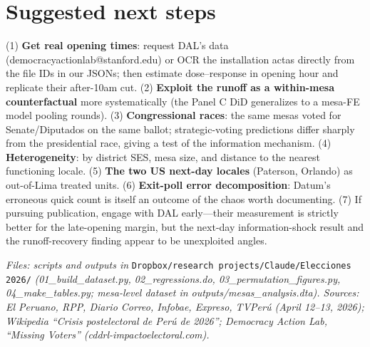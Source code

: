 \documentclass[11pt]{article}
\begin{document}
\section{Suggested next steps}

(1) \textbf{Get real opening times}: request DAL's data (democracyactionlab@stanford.edu) or OCR the installation actas directly from the file IDs in our JSONs; then estimate dose--response in opening hour and replicate their after-10am cut. (2) \textbf{Exploit the runoff as a within-mesa counterfactual} more systematically (the Panel C DiD generalizes to a mesa-FE model pooling rounds). (3) \textbf{Congressional races}: the same mesas voted for Senate/Diputados on the same ballot; strategic-voting predictions differ sharply from the presidential race, giving a test of the information mechanism. (4) \textbf{Heterogeneity}: by district SES, mesa size, and distance to the nearest functioning locale. (5) \textbf{The two US next-day locales} (Paterson, Orlando) as out-of-Lima treated units. (6) \textbf{Exit-poll error decomposition}: Datum's erroneous quick count is itself an outcome of the chaos worth documenting. (7) If pursuing publication, engage with DAL early---their measurement is strictly better for the late-opening margin, but the next-day information-shock result and the runoff-recovery finding appear to be unexploited angles.

\vspace{1em}
\noindent\footnotesize\emph{Files: scripts and outputs in} \texttt{Dropbox/research projects/Claude/Elecciones 2026/} \emph{(01\_build\_dataset.py, 02\_regressions.do, 03\_permutation\_figures.py, 04\_make\_tables.py; mesa-level dataset in outputs/mesas\_analysis.dta). Sources: El Peruano, RPP, Diario Correo, Infobae, Expreso, TVPerú (April 12--13, 2026); Wikipedia ``Crisis postelectoral de Perú de 2026''; Democracy Action Lab, ``Missing Voters'' (cddrl-impactoelectoral.com).}
\end{document}
